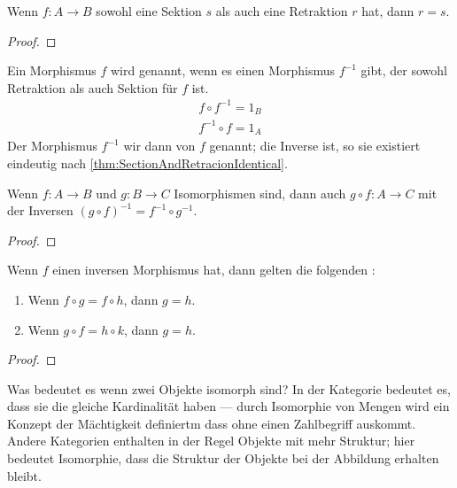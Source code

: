 \documentclass[parskip=half]{scrreprt}
\begin{document}
\begin{theorem}\label{thm:SectionAndRetractionIdentical}
Wenn $f: A → B$ sowohl eine Sektion $s$ als auch eine Retraktion $r$ hat,
dann $r = s$.
\end{theorem}
\begin{proof}
\end{proof}

\begin{definition}[Isomorphismus]
Ein Morphismus $f$ wird  genannt, 
wenn es einen Morphismus $f^{-1}$ gibt, der sowohl Retraktion als auch Sektion
für $f$ ist.
\begin{align*}
f ∘ f^{-1} = 1_B \\
f^{-1} ∘ f = 1_A
\end{align*}
Der Morphismus $f^{-1}$ wir dann  von $f$ genannt;
die Inverse ist, so sie existiert eindeutig nach \ref{thm:SectionAndRetracionIdentical}.
\end{definition}


\begin{theorem}
Wenn $f: A → B$ und $g: B → C$ Isomorphismen sind, 
dann auch $g ∘ f: A → C$ mit der Inversen $(g ∘ f)^{-1} = f^{-1} ∘ g^{-1}$.
\end{theorem}
\begin{proof}
\end{proof}

\begin{theorem}
Wenn $f$ einen inversen Morphismus hat, dann gelten die folgenden 
: %
\begin{enumerate}
\item Wenn $f ∘ g = f ∘ h$, dann $g = h$.
\item Wenn $g ∘ f = h ∘ k$, dann $g = h$.
\end{enumerate}
\end{theorem}
\begin{proof}
\end{proof}

\begin{remark}
Was bedeutet es wenn zwei Objekte isomorph sind?
In der Kategorie  bedeutet es, dass sie die gleiche Kardinalität
haben --- durch Isomorphie von Mengen wird ein Konzept der Mächtigkeit definiertm
dass ohne einen Zahlbegriff auskommt.
Andere Kategorien enthalten in der Regel Objekte mit mehr Struktur;
hier bedeutet Isomorphie, dass die Struktur der Objekte bei der Abbildung 
erhalten bleibt.
\end{remark}
\end{document}
